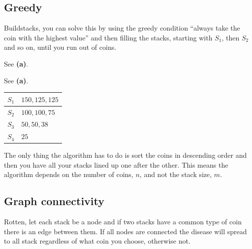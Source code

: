 \documentclass[a4paper]{article}
\newenvironment{task}[1]
{
	\begin{description}[align=right]
		\item [#1]
}{		%
	\end{description}
}
\newcommand{\taskref}[1]{\textbf{#1}}
\DeclareMathOperator{\*}{\cdot}
\begin{document}
\subsection*{Greedy}

\begin{task}{3. (a)}
	 Buildstacks, you can solve this by using the greedy condition ``always take the coin with the highest value'' and then filling the stacks, starting with $S_1$, then $S_2$ and so on, until you run out of coins.
\end{task}

\begin{task}{(b)}
	 See \taskref{(a)}.
\end{task}

\begin{task}{(c)}
	 See \taskref{(a)}.
\end{task}

\begin{task}{(d)}
	\begin{tabular}{r l}
		$S_1$ & $150,125,125$ \\ \hline
		$S_2$ & $100,100,75$ \\ \hline
		$S_3$ & $50,50,38$ \\ \hline
		$S_4$ & $25$ \\ 
	\end{tabular}
\end{task}

\begin{task}{(e)}
	 The only thing the algorithm has to do is sort the coins in descending order and then you have all your stacks lined up one after the other. This means the algorithm depends on the number of coins, $n$, and not the stack size, $m$.
\end{task}

\subsection*{Graph connectivity}

\begin{task}{4. (a)}
	 Rotten, let each stack be a node and if two stacks have a common type of coin there is an edge between them. If all nodes are connected the disease will spread to all stack regardless of what coin you choose, otherwise not.
\end{task}
\end{document}
